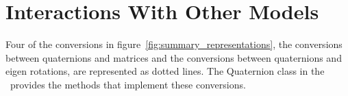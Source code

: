 \section*{Interactions With Other Models}
Four of the conversions in figure~\ref{fig:summary_representations},
the conversions between quaternions and matrices
and the conversions between quaternions and eigen rotations,
are represented as dotted lines.
The Quaternion class in the \QUATERNION~provides the methods that implement
these conversions.
